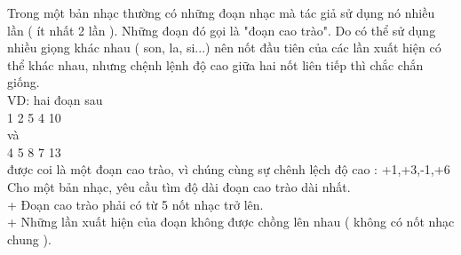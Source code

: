 Trong một bản nhạc thường có những đoạn nhạc mà tác giả sử dụng nó nhiều lần ( ít nhất 2 lần ). Những đoạn đó gọi là "đoạn cao trào". Do có thể sử dụng nhiều giọng khác nhau ( son, la, si...) nên nốt đầu tiên của các lần xuất hiện có thể khác nhau, nhưng chệnh lệnh độ cao giữa hai nốt liên tiếp thì chắc chắn giống.   
\\   VD: hai đoạn sau   
\\   1 2 5 4 10   
\\   và   
\\   4 5 8 7 13   
\\   được coi là một đoạn cao trào, vì chúng cùng sự chênh lệch độ cao : +1,+3,-1,+6   
\\   Cho một bản nhạc, yêu cầu tìm độ dài đoạn cao trào dài nhất.   
\\   + Đoạn cao trào phải có từ 5 nốt nhạc trở lên.   
\\   + Những lần xuất hiện của đoạn không được chồng lên nhau ( không có nốt nhạc chung ).   
\\

\